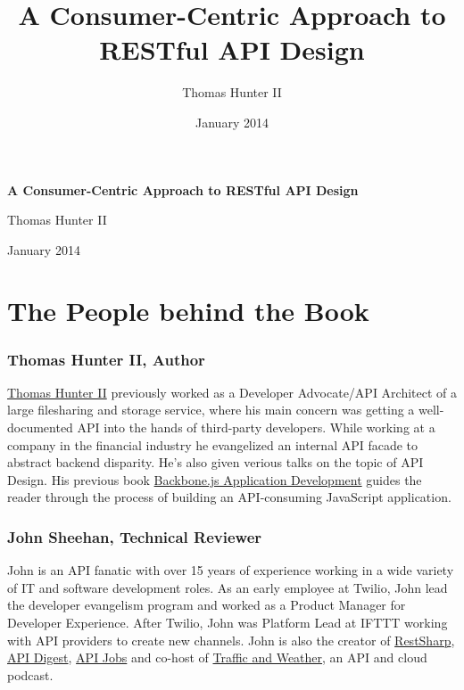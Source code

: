 \documentclass{book}
\title{A Consumer-Centric Approach to RESTful API Design}
\author{Thomas Hunter II}
\date{January 2014}
\begin{document}
\thispagestyle{empty}
\begin{center}

\LARGE{\textbf{A Consumer-Centric Approach to RESTful API Design}}

\null
\vfill

\Large{Thomas Hunter II}

\large{January 2014}

\end{center}

\newpage
\restoregeometry

\section*{The People behind the Book}

\subsubsection*{Thomas Hunter II, Author}

\href{http://thomashunter.name}{Thomas Hunter II} previously worked as a Developer Advocate/API Architect of a large filesharing and storage service, where his main concern was getting a well-documented API into the hands of third-party developers. While working at a company in the financial industry he evangelized an internal API facade to abstract backend disparity. He's also given verious talks on the topic of API Design. His previous book \href{http://amzn.to/1aqVRvq}{Backbone.js Application Development} guides the reader through the process of building an API-consuming JavaScript application.

\subsubsection*{John Sheehan, Technical Reviewer}

John is an API fanatic with over 15 years of experience working in a wide variety of IT and software development roles. As an early employee at Twilio, John lead the developer evangelism program and worked as a Product Manager for Developer Experience. After Twilio, John was Platform Lead at IFTTT working with API providers to create new channels. John is also the creator of \href{https://www.github.com/restsharp/restsharp}{RestSharp}, \href{http://www.apidigest.com/}{API Digest}, \href{http://www.api-jobs.com/}{API Jobs} and co-host of \href{http://trafficandweather.io/}{Traffic and Weather}, an API and cloud podcast.
\end{document}
